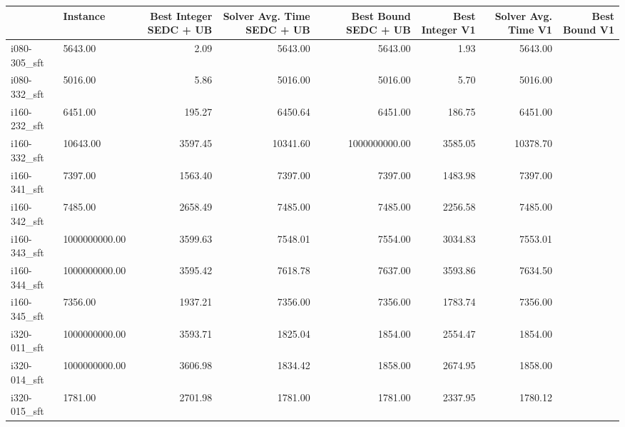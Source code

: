\begin{tabular}{llrrrrrr}
\toprule
{} &      Instance &  Best Integer SEDC + UB &  Solver Avg. Time SEDC + UB &  Best Bound SEDC + UB &  Best Integer V1 &  Solver Avg. Time V1 &  Best Bound V1 \\
\midrule
i080-305\_sft &                 5643.00 &                        2.09 &               5643.00 &          5643.00 &                 1.93 &        5643.00 \\
i080-332\_sft &                 5016.00 &                        5.86 &               5016.00 &          5016.00 &                 5.70 &        5016.00 \\
i160-232\_sft &                 6451.00 &                      195.27 &               6450.64 &          6451.00 &               186.75 &        6451.00 \\
i160-332\_sft &                10643.00 &                     3597.45 &              10341.60 &    1000000000.00 &              3585.05 &       10378.70 \\
i160-341\_sft &                 7397.00 &                     1563.40 &               7397.00 &          7397.00 &              1483.98 &        7397.00 \\
i160-342\_sft &                 7485.00 &                     2658.49 &               7485.00 &          7485.00 &              2256.58 &        7485.00 \\
i160-343\_sft &           1000000000.00 &                     3599.63 &               7548.01 &          7554.00 &              3034.83 &        7553.01 \\
i160-344\_sft &           1000000000.00 &                     3595.42 &               7618.78 &          7637.00 &              3593.86 &        7634.50 \\
i160-345\_sft &                 7356.00 &                     1937.21 &               7356.00 &          7356.00 &              1783.74 &        7356.00 \\
i320-011\_sft &           1000000000.00 &                     3593.71 &               1825.04 &          1854.00 &              2554.47 &        1854.00 \\
i320-014\_sft &           1000000000.00 &                     3606.98 &               1834.42 &          1858.00 &              2674.95 &        1858.00 \\
i320-015\_sft &                 1781.00 &                     2701.98 &               1781.00 &          1781.00 &              2337.95 &        1780.12 \\

\end{tabular}

